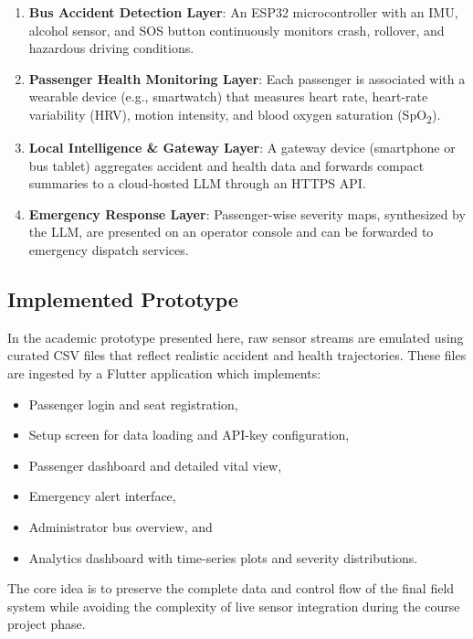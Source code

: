 \documentclass[conference]{IEEEtran}
\begin{document}
\begin{enumerate}
    \item \textbf{Bus Accident Detection Layer}: An ESP32 microcontroller with an IMU, alcohol sensor, and SOS button continuously monitors crash, rollover, and hazardous driving conditions.
    \item \textbf{Passenger Health Monitoring Layer}: Each passenger is associated with a wearable device (e.g., smartwatch) that measures heart rate, heart-rate variability (HRV), motion intensity, and blood oxygen saturation (SpO\textsubscript{2}).
    \item \textbf{Local Intelligence \& Gateway Layer}: A gateway device (smartphone or bus tablet) aggregates accident and health data and forwards compact summaries to a cloud-hosted LLM through an HTTPS API.
    \item \textbf{Emergency Response Layer}: Passenger-wise severity maps, synthesized by the LLM, are presented on an operator console and can be forwarded to emergency dispatch services.
\end{enumerate}

\subsection{Implemented Prototype}

In the academic prototype presented here, raw sensor streams are emulated using curated CSV files that reflect realistic accident and health trajectories.
These files are ingested by a Flutter application which implements:

\begin{itemize}
    \item Passenger login and seat registration,
    \item Setup screen for data loading and API-key configuration,
    \item Passenger dashboard and detailed vital view,
    \item Emergency alert interface,
    \item Administrator bus overview, and
    \item Analytics dashboard with time-series plots and severity distributions.
\end{itemize}

The core idea is to preserve the complete data and control flow of the final field system while avoiding the complexity of live sensor integration during the course project phase.
\end{document}
